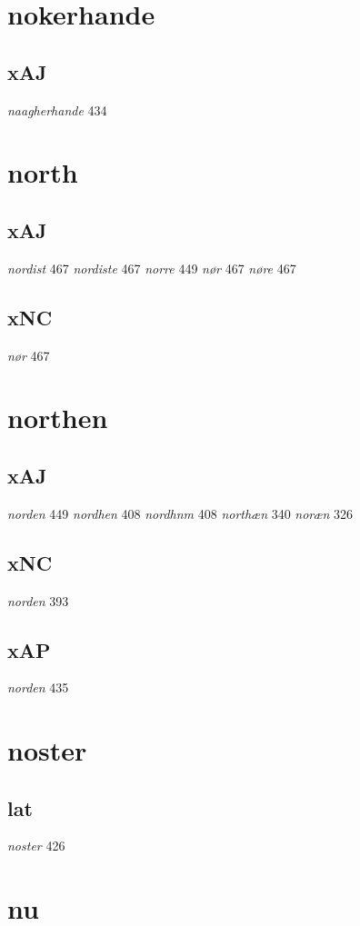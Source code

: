 \documentclass[a4paper,twocolumn]{article}
\begin{document}
\section{nokerhande}
\label{sec:org8098d89}
\subsection{xAJ}
\label{sec:org00f7579}
\emph{naagherhande} 434 
\section{north}
\label{sec:orgeeaf117}
\subsection{xAJ}
\label{sec:orgb50b6ce}
\emph{nordist} 467 \emph{nordiste} 467 \emph{norre} 449 \emph{nør} 467 \emph{nøre} 467 
\subsection{xNC}
\label{sec:org5f78e0f}
\emph{nør} 467 
\section{northen}
\label{sec:org8a5d49c}
\subsection{xAJ}
\label{sec:orgef15578}
\emph{norden} 449 \emph{nordhen} 408 \emph{nordhnm} 408 \emph{northæn} 340 \emph{noræn} 326 
\subsection{xNC}
\label{sec:org02a3f1d}
\emph{norden} 393 
\subsection{xAP}
\label{sec:org94afedd}
\emph{norden} 435 
\section{noster}
\label{sec:org6c0df26}
\subsection{lat}
\label{sec:org24f2b1e}
\emph{noster} 426 
\section{nu}
\label{sec:orga12e0cc}
\end{document}
